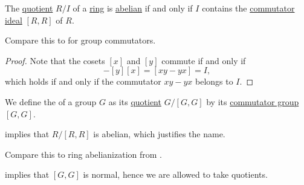 \begin{proposition}\label{thm:quotient_is_abelian_iff_ideal_contains_commutator}
  The \hyperref[def:ring/quotient]{quotient} \( R / I \) of a \hyperref[def:ring]{ring} is \hyperref[def:abelian_group]{abelian} if and only if \( I \) contains the \hyperref[def:ring_commutator]{commutator ideal} \( [R, R] \) of \( R \).
\end{proposition}
\begin{comments}
  \item Compare this to  for group commutators.
\end{comments}
\begin{proof}
  Note that the cosets \( [x] \) and \( [y] \) commute if and only if
  \begin{equation*}
    [x] [y] - [y] [x] = [xy - yx] = I,
  \end{equation*}
  which holds if and only if the commutator \( xy - yx \) belongs to \( I \).
\end{proof}

\begin{definition}\label{def:ring_abelianization}\mimprovised
   We define the  of a group \( G \) as its \hyperref[def:group/quotient]{quotient} \( G / [G, G] \) by its \hyperref[def:group_commutator]{commutator group} \( [G, G] \).
\end{definition}
\begin{comments}
  \item {} implies that \( R / [R, R] \) is abelian, which justifies the name.
  \item Compare this to ring abelianization from .
\end{comments}
\begin{defproof}
   implies that \( [G, G] \) is normal, hence we are allowed to take quotients.
\end{defproof}

